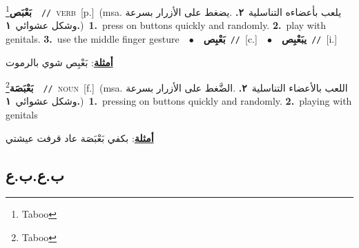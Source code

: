 \documentclass[10pt,a4paper,twoside]{article} %
\begin{document}
\begin{multicols}{2}
{\setlength\topsep{0pt}\textbf{\foreignlanguage{arabic}{بَعْبَص}}\footnote{Taboo}\ \ {\color{gray}\texttt{//}\color{black}}\ \textsc{verb}\ [p.]\ \color{gray}(msa. \foreignlanguage{arabic}{يلعب بأعضاءه التناسلية}~\foreignlanguage{arabic}{\textbf{٢.}}  .\foreignlanguage{arabic}{يضغط على الأزرار بسرعة وشكل عشوائي}~\foreignlanguage{arabic}{\textbf{١.}})\color{black}\ \textbf{1.}~press on buttons quickly and randomly.  \textbf{2.}~play with genitals.  \textbf{3.}~use the middle finger gesture\ \ $\bullet$\ \ \setlength\topsep{0pt}\textbf{\foreignlanguage{arabic}{بَعْبِص}}\ {\color{gray}\texttt{//}\color{black}}\ [c.]\ \ $\bullet$\ \ \setlength\topsep{0pt}\textbf{\foreignlanguage{arabic}{يبَعْبِص}}\ {\color{gray}\texttt{//}\color{black}}\ [i.]\  \begin{flushright}\color{gray}\foreignlanguage{arabic}{\textbf{\underline{\foreignlanguage{arabic}{أمثلة}}}: بَعْبِص شوي بالرموت}\end{flushright}\color{black}} \vspace{2mm}

{\setlength\topsep{0pt}\textbf{\foreignlanguage{arabic}{بَعْبَصَة}}\footnote{Taboo}\ \ {\color{gray}\texttt{//}\color{black}}\ \textsc{noun}\ [f.]\ \color{gray}(msa. \foreignlanguage{arabic}{اللعب بالأعضاء التناسلية}~\foreignlanguage{arabic}{\textbf{٢.}}  .\foreignlanguage{arabic}{الضَّغط على الأزرار بسرعة وشكل عشوائي}~\foreignlanguage{arabic}{\textbf{١.}})\color{black}\ \textbf{1.}~pressing on buttons quickly and randomly.  \textbf{2.}~playing with genitals\  \begin{flushright}\color{gray}\foreignlanguage{arabic}{\textbf{\underline{\foreignlanguage{arabic}{أمثلة}}}: بكفي بَعْبَصَة عاد قرفت عيشتي}\end{flushright}\color{black}} \vspace{2mm}

\vspace{-3mm}
\subsection*{\color{blue}\foreignlanguage{arabic}{ب.ع.ب.ع}\color{blue}{}} 


\end{multicols}
\end{document}
